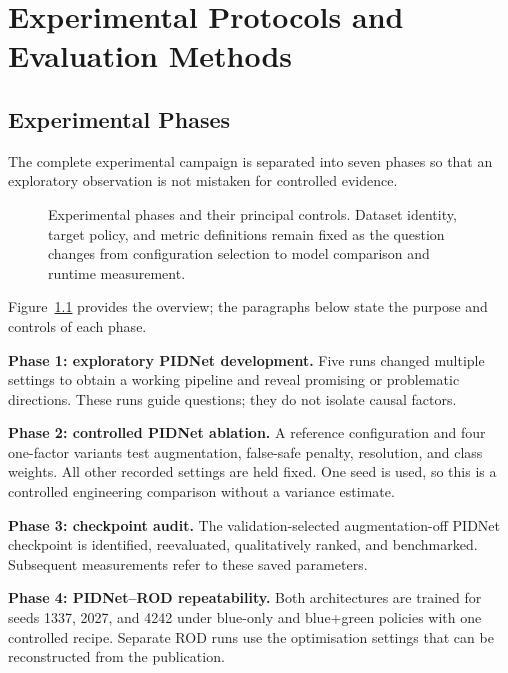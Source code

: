 \chapter{Experimental Protocols and Evaluation Methods}
\label{ch:protocols}

\section{Experimental Phases}

The complete experimental campaign is separated into seven phases so that an
exploratory observation is not mistaken for controlled evidence.

\begin{figure}[H]
\centering
\resizebox{\textwidth}{!}{}
\caption[Experimental phases and controls.]{Experimental phases and their
principal controls. Dataset identity, target policy, and metric definitions
remain fixed as the question changes from configuration selection to model
comparison and runtime measurement.}
\label{fig:experimental_design}
\end{figure}

Figure~\ref{fig:experimental_design} provides the overview; the paragraphs
below state the purpose and controls of each phase.

\textbf{Phase 1: exploratory PIDNet development.} Five runs changed multiple
settings to obtain a working pipeline and reveal promising or problematic
directions. These runs guide questions; they do not isolate causal factors.

\textbf{Phase 2: controlled PIDNet ablation.} A reference configuration and
four one-factor variants test augmentation, false-safe penalty, resolution,
and class weights. All other recorded settings are held fixed. One seed is
used, so this is a controlled engineering comparison without a variance
estimate.

\textbf{Phase 3: checkpoint audit.} The validation-selected augmentation-off
PIDNet checkpoint is identified, reevaluated, qualitatively ranked, and
benchmarked. Subsequent measurements refer to these saved parameters.

\textbf{Phase 4: PIDNet--ROD repeatability.} Both architectures are
trained for seeds 1337, 2027, and 4242 under blue-only and blue+green policies
with one controlled recipe. Separate ROD runs use the optimisation settings
that can be reconstructed from the publication.

